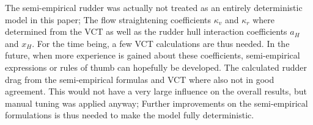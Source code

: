 The semi-empirical rudder was actually not treated as an entirely deterministic model in this paper; The flow straightening coefficients $\kappa_v$ and $\kappa_r$ where determined from the VCT as well as the rudder hull interaction coefficients $a_H$ and $x_H$. For the time being, a few VCT calculations are thus needed.
In the future, when more experience is gained about these coefficients, semi-empirical expressions or rules of thumb can hopefully be developed.
The calculated rudder drag from the semi-empirical formulas and VCT where also not in good agreement.
This would not have a very large influence on the overall results, but manual tuning was applied anyway;
Further improvements on the semi-empirical formulations is thus needed to make the model fully deterministic.
